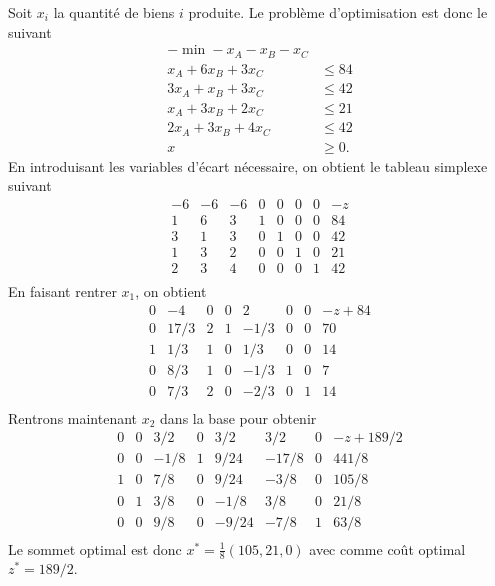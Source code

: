 \begin{enumerate}
    \begin{solution}
      Soit $x_i$ la quantité de biens $i$ produite.
      Le problème d'optimisation est donc le suivant
      \begin{align*}
        -\min -x_A - x_B - x_C\\
         x_A + 6x_B + 3x_C & \leq 84\\
        3x_A +  x_B + 3x_C & \leq 42\\
         x_A + 3x_B + 2x_C & \leq 21\\
        2x_A + 3x_B + 4x_C & \leq 42\\
        x & \geq 0.
      \end{align*}
      En introduisant les variables d'écart nécessaire,
      on obtient le tableau simplexe suivant
      \[
        \begin{array}{ccccccc|l}
          -6 & -6 & -6 & 0 & 0 & 0 & 0 & -z\\
          \hline
           1 &  6 &  3 & 1 & 0 & 0 & 0 & 84\\
           3 &  1 &  3 & 0 & 1 & 0 & 0 & 42\\
           1 &  3 &  2 & 0 & 0 & 1 & 0 & 21\\
           2 &  3 &  4 & 0 & 0 & 0 & 1 & 42\\
        \end{array}
      \]
      En faisant rentrer $x_1$, on obtient
      \[
        \begin{array}{ccccccc|l}
          0 & -4   & 0 & 0 &  2   & 0 & 0 & -z+84\\
          \hline
          0 & 17/3 & 2 & 1 & -1/3 & 0 & 0 & 70\\
          1 &  1/3 & 1 & 0 &  1/3 & 0 & 0 & 14\\
          0 &  8/3 & 1 & 0 & -1/3 & 1 & 0 & 7\\
          0 &  7/3 & 2 & 0 & -2/3 & 0 & 1 & 14\\
        \end{array}
      \]
      Rentrons maintenant $x_2$ dans la base pour obtenir
      \[
        \begin{array}{ccccccc|l}
          0 & 0 &  3/2 & 0 &  3/2  &   3/2 & 0 & -z+189/2\\
          \hline
          0 & 0 & -1/8 & 1 &  9/24 & -17/8 & 0 & 441/8\\
          1 & 0 &  7/8 & 0 &  9/24 &  -3/8 & 0 & 105/8\\
          0 & 1 &  3/8 & 0 & -1/8  &   3/8 & 0 & 21/8\\
          0 & 0 &  9/8 & 0 & -9/24 &  -7/8 & 1 & 63/8\\
        \end{array}
      \]
      Le sommet optimal est donc $x^* = \frac{1}{8}(105,21,0)$ avec comme
      coût optimal $z^* = 189/2$.
    \end{solution}


\end{enumerate}
